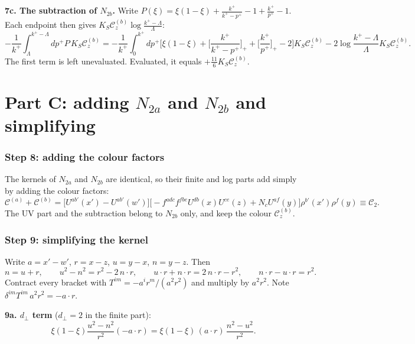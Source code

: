 \documentclass[10pt]{article}
\numberwithin{equation}{section}
\begin{document}
\textbf{7c. The subtraction of $N_{2b}$.} Write $P(\xi)=\xi(1-\xi)+\frac{k^{+}}{k^{+}-p^{+}}-1+\frac{k^{+}}{p^{+}}-1$. Each endpoint then gives $K_{S}\mathcal{C}^{(b)}_{z}\log\frac{k^{+}-\Lambda}{\Lambda}$:
\begin{equation}
-\frac{1}{k^{+}}\!\int_{\Lambda}^{k^{+}-\Lambda}\!\!dp^{+}P\,K_{S}\mathcal{C}^{(b)}_{z}=-\frac{1}{k^{+}}\!\int_{0}^{k^{+}}\!\!dp^{+}\Big[\xi(1-\xi)+\Big[\frac{k^{+}}{k^{+}-p^{+}}\Big]_{+}+\Big[\frac{k^{+}}{p^{+}}\Big]_{+}-2\Big]K_{S}\mathcal{C}^{(b)}_{z}-2\log\frac{k^{+}-\Lambda}{\Lambda}K_{S}\mathcal{C}^{(b)}_{z}.
\end{equation}
The first term is left unevaluated. Evaluated, it equals $+\frac{11}{6}K_{S}\mathcal{C}^{(b)}_{z}$.


\part*{Part C: adding $N_{2a}$ and $N_{2b}$ and simplifying}

\section{Step 8: adding the colour factors}
The kernels of $N_{2a}$ and $N_{2b}$ are identical, so their finite and log parts add simply by adding the colour factors:
\begin{equation}
\mathcal{C}^{(a)}+\mathcal{C}^{(b)}=\Big[U^{ab'}(x')-U^{ab'}(w')\Big]\Big[-f^{adc}f^{fbe}U^{db}(x)U^{ce}(z)+N_{c}U^{af}(y)\Big]\rho^{b'}(x')\rho^{f}(y)\equiv\mathcal{C}_{2}.
\end{equation}
The UV part and the subtraction belong to $N_{2b}$ only, and keep the colour $\mathcal{C}^{(b)}_{z}$.

\section{Step 9: simplifying the kernel}
Write $a=x'-w'$, $r=x-z$, $u=y-x$, $n=y-z$. Then
\begin{equation}
n=u+r,\qquad u^{2}-n^{2}=r^{2}-2\,n\cdot r,\qquad u\cdot r+n\cdot r=2\,n\cdot r-r^{2},\qquad n\cdot r-u\cdot r=r^{2}.
\end{equation}
Contract every bracket with $T^{im}=-a^{i}r^{m}/(a^{2}r^{2})$ and multiply by $a^{2}r^{2}$. Note $\delta^{im}T^{im}\,a^{2}r^{2}=-a\cdot r$.

\textbf{9a. $d_{\perp}$ term} ($d_{\perp}=2$ in the finite part):
\begin{equation}
\xi(1-\xi)\frac{u^{2}-n^{2}}{r^{2}}(-a\cdot r)=\xi(1-\xi)\,(a\cdot r)\,\frac{n^{2}-u^{2}}{r^{2}}.
\end{equation}
\end{document}
